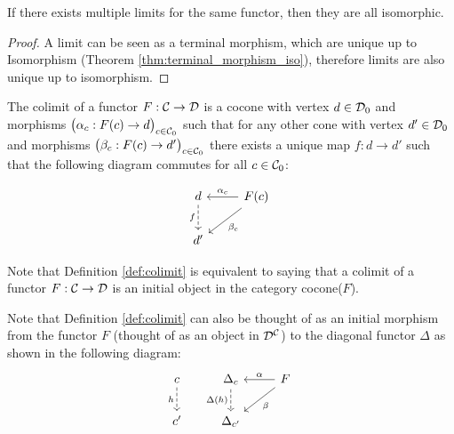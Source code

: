 \begin{theorem}
	If there exists multiple limits for the same functor, then they are all
	isomorphic.

	\begin{proof}
		A limit can be seen as a terminal morphism, which are unique up to
		Isomorphism (Theorem \ref{thm:terminal_morphism_iso}), therefore limits are
		also unique up to isomorphism.
	\end{proof}
\end{theorem}

\begin{definition}
	The colimit of a functor $F:\mathcal{C}\to \mathcal{D}$ is a cocone with vertex $d\in \mathcal{D}_0$ and
	morphisms $\big(\alpha_c: F(c)\to d\big)_{c\in \mathcal{C}_0}$ such that for any other
	cone with vertex $d'\in \mathcal{D}_0$ and morphisms $\big(\beta_c: F(c)\to
	d'\big)_{c\in \mathcal{C}_0}$ there exists a unique map $f:d\to d'$ such that the
	following diagram commutes for all $c\in \mathcal{C}_0$:
	\parencite{leinster:basic_category_theory}

	\[\begin{tikzcd}[ampersand replacement=\&]
		d \& {F(c)} \\
		{d'}
		\arrow["{\alpha_c}"', from=1-2, to=1-1]
		\arrow["{\beta_c}", from=1-2, to=2-1]
		\arrow["f"', dashed, from=1-1, to=2-1]
	\end{tikzcd}\]
\end{definition}

\begin{remark}
	Note that Definition \ref{def:colimit} is equivalent to saying that a colimit
	of a functor $F:\mathcal{C}\to \mathcal{D}$ is an initial object in the category cocone($F$).
\end{remark}

\begin{remark}
	Note that Definition \ref{def:colimit} can also be thought of as an initial
	morphism from the functor $F$ (thought of as an object in $\mathcal{D}^{\mathcal{C}}$) to the diagonal functor $\Delta$ as shown in the following diagram:
	\[\begin{tikzcd}[ampersand replacement=\&]
		c \& {\Delta_c} \& F \\
		{c'} \& {\Delta_{c'}}
		\arrow["h"', dashed, from=1-1, to=2-1]
		\arrow["{\Delta(h)}"', dashed, from=1-2, to=2-2]
		\arrow["\beta", from=1-3, to=2-2]
		\arrow["\alpha"', from=1-3, to=1-2]
	\end{tikzcd}\]
\end{remark}

